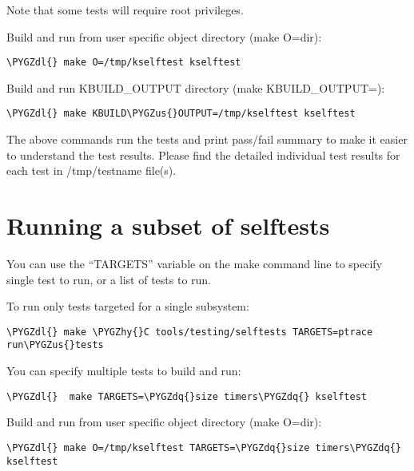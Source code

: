 \documentclass[a4paper,8pt,english]{sphinxmanual}
\def\PYGZus{\char`\_}
\def\PYGZdl{\char`\$}
\def\PYGZhy{\char`\-}
\def\PYGZdq{\char`\"}
\begin{document}
Note that some tests will require root privileges.

Build and run from user specific object directory (make O=dir):

\begin{Verbatim}[commandchars=\\\{\}]
\PYGZdl{} make O=/tmp/kselftest kselftest
\end{Verbatim}

Build and run KBUILD\_OUTPUT directory (make KBUILD\_OUTPUT=):

\begin{Verbatim}[commandchars=\\\{\}]
\PYGZdl{} make KBUILD\PYGZus{}OUTPUT=/tmp/kselftest kselftest
\end{Verbatim}

The above commands run the tests and print pass/fail summary to make it
easier to understand the test results. Please find the detailed individual
test results for each test in /tmp/testname file(s).


\section{Running a subset of selftests}
\label{dev-tools/kselftest:running-a-subset-of-selftests}
You can use the ``TARGETS'' variable on the make command line to specify
single test to run, or a list of tests to run.

To run only tests targeted for a single subsystem:

\begin{Verbatim}[commandchars=\\\{\}]
\PYGZdl{} make \PYGZhy{}C tools/testing/selftests TARGETS=ptrace run\PYGZus{}tests
\end{Verbatim}

You can specify multiple tests to build and run:

\begin{Verbatim}[commandchars=\\\{\}]
\PYGZdl{}  make TARGETS=\PYGZdq{}size timers\PYGZdq{} kselftest
\end{Verbatim}

Build and run from user specific object directory (make O=dir):

\begin{Verbatim}[commandchars=\\\{\}]
\PYGZdl{} make O=/tmp/kselftest TARGETS=\PYGZdq{}size timers\PYGZdq{} kselftest
\end{Verbatim}
\end{document}
